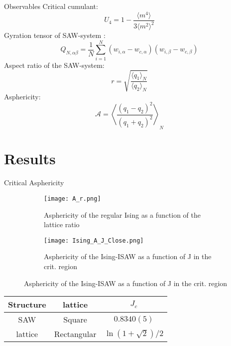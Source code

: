 \documentclass{beamer}
\begin{document}
\begin{frame}{Observables}
Critical cumulant:
\begin{equation}
\label{eq:Cumulant}
U_{4} = 1 - \frac{\langle m^{4} \rangle}{3 \langle m^{2} \rangle^{2}}
\end{equation}
Gyration tensor of SAW-system \cite{Caracciolo2011}:
\begin{equation}\label{eq:Ten_G1}
    Q_{N,\alpha\beta} = \frac{1}{N} \sum^{N}_{i=1}(w_{i,\alpha} - w_{c, \alpha})(w_{i,\beta} - w_{c, \beta})
\end{equation}
Aspect ratio of the SAW-system:
\begin{equation}
    r = \sqrt{\frac{\langle q_{1}\rangle_{N}}{\langle q_{2} \rangle_{N}}}
\end{equation}
Asphericity:
\begin{equation}
\label{eq:Asphericity}
    \mathcal{A} = \left\langle \frac{(q_{1} - q_{2})^{2}}{(q_{1} + q_{2})^{2}} \right\rangle_{N}
\end{equation}

\end{frame}

\section{Results}

\begin{frame}{Critical Asphericity}

\begin{figure}
\centering
\begin{subfigure}{0.45\textwidth}
\texttt{[image: A\_r.png]}
\caption{Asphericity of the regular Ising as a function of the lattice ratio}
\end{subfigure}
\hfill
\begin{subfigure}{0.45\textwidth}
\texttt{[image: Ising\_A\_J\_Close.png]}
\caption{Asphericity of the Ising-ISAW as a function of J in the crit. region}
\end{subfigure}
\end{figure}


\begin{table}
\begin{tabular}{|c|c|c|}
    \hline
        Structure & lattice & $J_{c}$ \\ \hline
        SAW & Square & $0.8340(5)$\cite{faizullina2021critical} \\ \hline
        lattice & Rectangular & $\ln{(1 + \sqrt{2}) / 2}$\cite{Onsager}\\ \hline
\end{tabular}
\end{table}
\end{frame}
\end{document}
